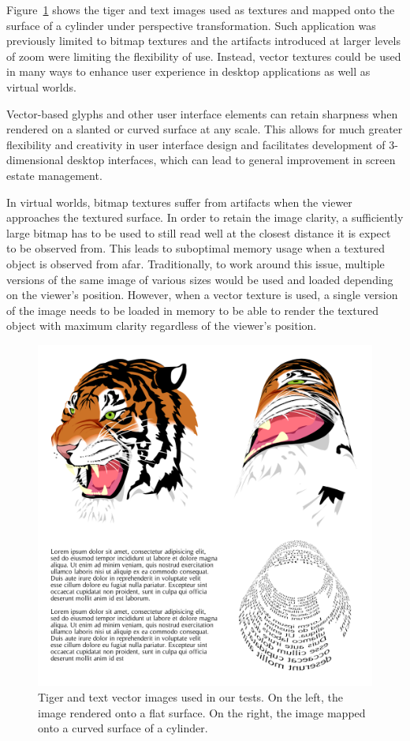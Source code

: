 \documentclass[11pt,a4paper,twoside]{article}
\begin{document}
Figure~\ref{fig:screenshots} shows the tiger and text images used as textures and mapped onto the surface of a cylinder under perspective transformation. Such application was previously limited to bitmap textures and the artifacts introduced at larger levels of zoom were limiting the flexibility of use. Instead, vector textures could be used in many ways to enhance user experience in desktop applications as well as virtual worlds.

Vector-based glyphs and other user interface elements can retain sharpness when rendered on a slanted or curved surface at any scale. This allows for much greater flexibility and creativity in user interface design and facilitates development of 3-dimensional desktop interfaces, which can lead to general improvement in screen estate management.

In virtual worlds, bitmap textures suffer from artifacts when the viewer approaches the textured surface. In order to retain the image clarity, a sufficiently large bitmap has to be used to still read well at the closest distance it is expect to be observed from. This leads to suboptimal memory usage when a textured object is observed from afar. Traditionally, to work around this issue, multiple versions of the same image of various sizes would be used and loaded depending on the viewer's position. However, when a vector texture is used, a single version of the image needs to be loaded in memory to be able to render the textured object with maximum clarity regardless of the viewer's position.

\begin {figure}
	\centering
	\includegraphics[width=1.0\columnwidth] {figures/render_all}
	\caption {Tiger and text vector images used in our tests. On the left, the image rendered onto a flat surface. On the right, the image mapped onto a curved surface of a cylinder.}
	\label {fig:screenshots}
\end {figure}

\newpage


\end{document}
